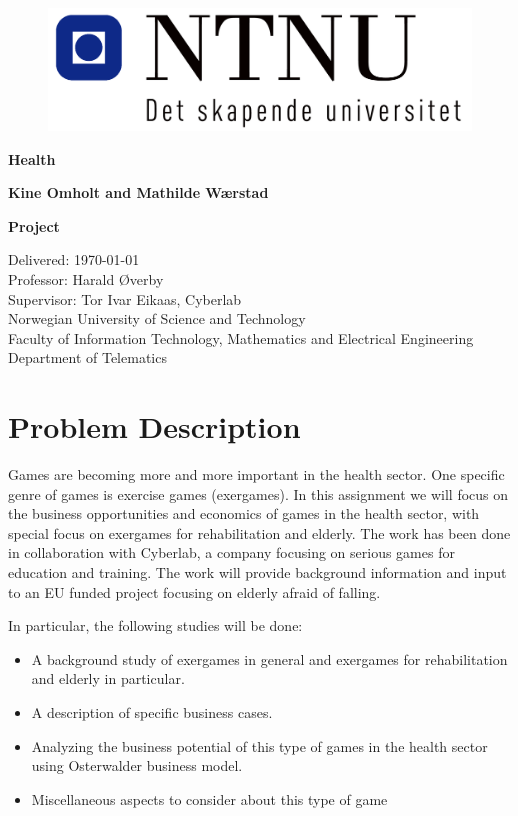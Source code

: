 \documentclass[b5paper,twoside,openright,11pt]{report}
\begin{document}
\begin{flushleft}
\begin{figure}[htb]
\includegraphics[scale=0.6]{NTNU-logo}
\end{figure}
\bigskip
\bigskip
\bigskip
\bigskip
\begin{huge}
\textbf{Health}\\
\end{huge} 
\bigskip
\bigskip
\bigskip
\bigskip
\bigskip
\bigskip
\bigskip
\begin{Large}
\textbf{Kine Omholt and Mathilde Wærstad}
\end{Large}
\bigskip
\bigskip
\bigskip
\bigskip
\bigskip
\bigskip
\begin{large}
\textbf{Project\\}
\end{large}
Delivered: \today\\
Professor: Harald Øverby\\
Supervisor: Tor Ivar Eikaas, Cyberlab\\
\bigskip
\bigskip
\bigskip
\bigskip
\bigskip
Norwegian University of Science and Technology\\ 
Faculty of Information Technology, Mathematics and Electrical Engineering\\
Department of Telematics
\end{flushleft}
\chapter*{Problem Description} 
Games are becoming more and more important in the health sector. One specific genre of games is exercise games (exergames). In this assignment we will focus on the business opportunities and economics of games in the health sector, with special focus on exergames for rehabilitation and elderly. The work has been done in collaboration with Cyberlab, a company focusing on serious games for education and training. The work will provide background information and input to an EU funded project focusing on elderly afraid of falling.

In particular, the following studies will be done: 
\begin{itemize}
\renewcommand{\labelitemi}{$\bullet$}
\item A background study of exergames in general and exergames for rehabilitation and elderly in particular.
\item	A description of specific business cases.
\item	Analyzing the business potential of this type of games in the health sector using Osterwalder business model.
\item	Miscellaneous aspects to consider about this type of game
\end{itemize}
\cleardoublepage
\end{document}
